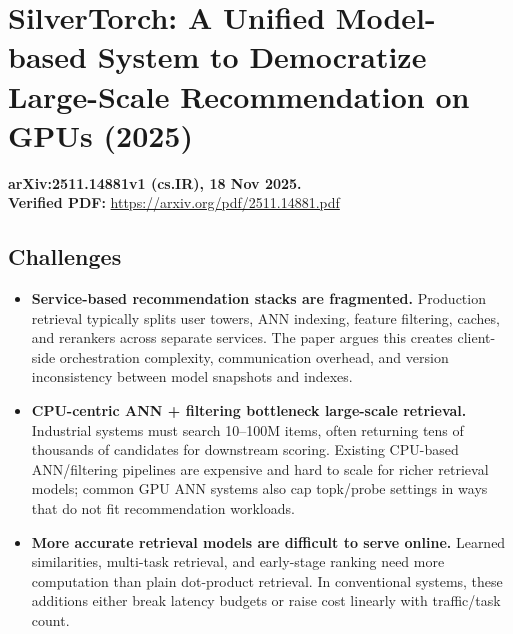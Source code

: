 \documentclass{article}
\begin{document}
\section*{SilverTorch: A Unified Model-based System to Democratize Large-Scale Recommendation on GPUs (2025)}
\textbf{arXiv:2511.14881v1 (cs.IR), 18 Nov 2025.}\\
\textbf{Verified PDF:} \url{https://arxiv.org/pdf/2511.14881.pdf}

\subsection*{Challenges}
\begin{itemize}[leftmargin=1.5em]
  \item \textbf{Service-based recommendation stacks are fragmented.} Production retrieval typically splits user towers, ANN indexing, feature filtering, caches, and rerankers across separate services. The paper argues this creates client-side orchestration complexity, communication overhead, and version inconsistency between model snapshots and indexes.
  \item \textbf{CPU-centric ANN + filtering bottleneck large-scale retrieval.} Industrial systems must search 10--100M items, often returning tens of thousands of candidates for downstream scoring. Existing CPU-based ANN/filtering pipelines are expensive and hard to scale for richer retrieval models; common GPU ANN systems also cap topk/probe settings in ways that do not fit recommendation workloads.
  \item \textbf{More accurate retrieval models are difficult to serve online.} Learned similarities, multi-task retrieval, and early-stage ranking need more computation than plain dot-product retrieval. In conventional systems, these additions either break latency budgets or raise cost linearly with traffic/task count.
\end{itemize}
\end{document}
